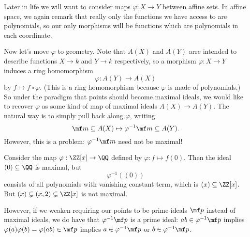 Later in life we will want to consider maps $\varphi:X\to Y$ between affine sets. In affine space, we again remark that really only the functions we have access to are polynomials, so our only morphisms will be functions which are polynomials in each coordinate.

Now let's move $\varphi$ to geometry. Note that $A(X)$ and $A(Y)$ arre intended to describe functions $X\to k$ and $Y\to k$ respectively, so a morphism $\varphi:X\to Y$ induces a ring homomorphism
\[\varphi:A(Y)\rightarrow A(X)\]
by $f\mapsto f\circ\varphi$. (This is a ring homomorphism because $\varphi$ is made of polynomials.) So under the paradigm that points should become maximal ideals, we would like to recover $\varphi$ as some kind of map of maximal ideals $A(X)\to A(Y)$. The natural way is to simply pull back along $\varphi$, writing
\[\mf m\subseteq A(X)\mapsto\varphi^{-1}\mf m\subseteq A(Y).\]
However, this is a problem: $\varphi^{-1}\mf m$ need not be maximal!
\begin{example}
	Consider the map $\varphi:\ZZ[x]\to\QQ$ defined by $\varphi:f\mapsto f(0)$. Then the ideal $(0)\subseteq\QQ$ is maximal, but
	\[\varphi^{-1}((0))\]
	consists of all polynomials with vanishing constant term, which is $(x)\subseteq\ZZ[x]$. But $(x)\subsetneq(x,2)\subsetneq\ZZ[x]$ is not maximal.
\end{example}
However, if we weaken requiring our points to be prime ideals $\mf p$ instead of maximal ideals, we do have that $\varphi^{-1}\mf p$ is a prime ideal: $ab\in\varphi^{-1}\mf p$ implies $\varphi(a)\varphi(b)=\varphi(ab)\in\mf p$ implies $a\in\varphi^{-1}\mf p$ or $b\in\varphi^{-1}\mf p$.

